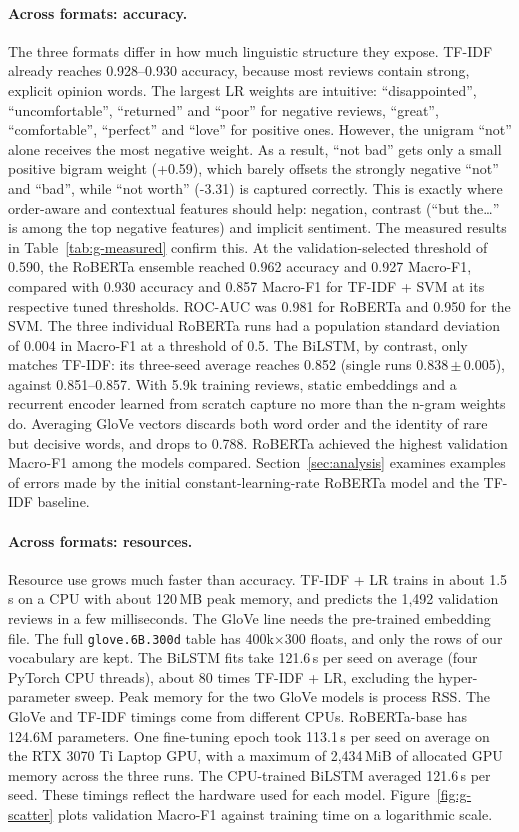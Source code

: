 \paragraph{Across formats: accuracy.}
The three formats differ in how much linguistic structure they expose.
TF-IDF already reaches 0.928--0.930 accuracy, because most reviews contain strong, explicit opinion words.
The largest LR weights are intuitive: ``disappointed'', ``uncomfortable'', ``returned'' and ``poor'' for negative reviews, ``great'', ``comfortable'', ``perfect'' and ``love'' for positive ones.
However, the unigram ``not'' alone receives the most negative weight. As a result, ``not bad'' gets only a small positive bigram weight (+0.59), which barely offsets the strongly negative ``not'' and ``bad'', while ``not worth'' (-3.31) is captured correctly.
This is exactly where order-aware and contextual features should help: negation, contrast (``but the\dots'' is among the top negative features) and implicit sentiment.
The measured results in Table~\ref{tab:g-measured} confirm this.
At the validation-selected threshold of 0.590, the RoBERTa
ensemble reached 0.962 accuracy and 0.927 Macro-F1, compared
with 0.930 accuracy and 0.857 Macro-F1 for TF-IDF + SVM
at its respective tuned thresholds. ROC-AUC was 0.981 for RoBERTa
and 0.950 for the SVM. The three individual RoBERTa runs had a
population standard deviation of 0.004 in
Macro-F1 at a threshold of 0.5.
The BiLSTM, by contrast, only matches TF-IDF: its three-seed average reaches 0.852 (single runs 0.838\,$\pm$\,0.005), against 0.851--0.857. With 5.9k training reviews, static embeddings and a recurrent encoder learned from scratch capture no more than the n-gram weights do.
Averaging GloVe vectors discards both word order and the identity of rare but decisive words, and drops to 0.788.
RoBERTa achieved the highest validation Macro-F1 among the models
compared. Section~\ref{sec:analysis} examines examples of errors made by the initial
constant-learning-rate RoBERTa model and the TF-IDF baseline.

\paragraph{Across formats: resources.}
Resource use grows much faster than accuracy.
TF-IDF + LR trains in about 1.5\,s on a CPU with about 120\,MB peak memory, and predicts the 1{,}492 validation reviews in a few milliseconds.
The GloVe line needs the pre-trained embedding file. The full \texttt{glove.6B.300d} table has 400k$\times$300 floats, and only the rows of our vocabulary are kept. The BiLSTM fits take 121.6\,s per seed on average (four PyTorch CPU threads), about 80 times TF-IDF + LR, excluding the hyper-parameter sweep. Peak memory for the two GloVe models is process RSS. The GloVe and TF-IDF timings come from different CPUs.
RoBERTa-base has 124.6M parameters. One fine-tuning epoch took
113.1\,s per seed on average on the RTX 3070 Ti Laptop GPU,
with a maximum of 2{,}434\,MiB of allocated GPU memory across
the three runs. The CPU-trained BiLSTM averaged 121.6\,s per seed.
These timings reflect the hardware used for each model.
Figure~\ref{fig:g-scatter} plots validation Macro-F1 against
training time on a logarithmic scale.

